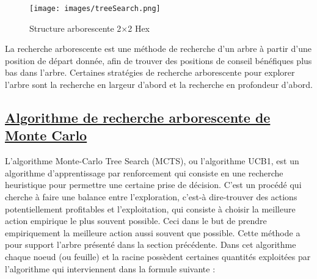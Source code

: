 \documentclass[12pt]{article}
\begin{document}
\begin{figure}[h!]
		\centering
		\texttt{[image: images/treeSearch.png]}
		\caption{Structure arborescente  2×2 Hex}
		\label{eq1}
	\end{figure}
 
La recherche arborescente est une méthode de recherche d'un arbre à partir d'une position de départ donnée, afin de trouver des positions de conseil bénéfiques plus bas dans l'arbre. Certaines stratégies de recherche arborescente pour explorer l'arbre sont la recherche en largeur d'abord et la recherche en profondeur d'abord.
	\subsection{\underline{Algorithme de recherche arborescente de Monte Carlo}}

   L’algorithme Monte-Carlo Tree Search (MCTS), ou l’algorithme UCB1, est un algorithme
d’apprentissage par renforcement qui consiste en une recherche heuristique pour
permettre une certaine prise de décision. C’est un procédé qui cherche à faire une
balance entre l’exploration, c’est-à dire-trouver des actions potentiellement profitables et
l’exploitation, qui consiste à choisir la meilleure action empirique le plus souvent possible.
Ceci dans le but de prendre empiriquement la meilleure action aussi souvent que
possible. Cette méthode a pour support l’arbre présenté dans la section précédente.
Dans cet algorithme chaque noeud (ou feuille) et la racine possèdent certaines quantités
exploitées par l’algorithme qui interviennent dans la formule suivante :
\end{document}
